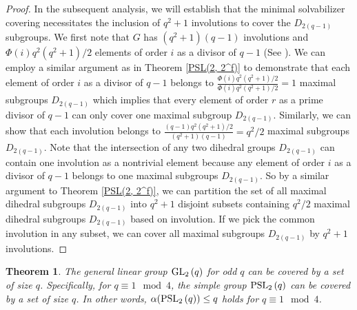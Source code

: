 \documentclass{amsart}
\newtheorem{theorem}{Theorem}[section]
\theoremstyle{definition}
\theoremstyle{remark}
\begin{document}
\begin{proof}
In the subsequent analysis, we will establish that the minimal solvabilizer covering necessitates the inclusion of $q^2+1$ involutions to cover the $D_{2(q-1)}$ subgroups. We first note that $G$ has  $(q^2+1)(q-1)$ involutions and $\Phi(i)q^2(q^2+1)/2$ elements of order $i$ as a divisor of $q-1$ (See \cite{Alavi}). We can employ a similar argument as in Theorem \ref{PSL(2, 2^f)} to demonstrate that each element of order $i$ as a divisor of $q-1$ belongs to $\frac{\Phi(i)q^2(q^2+1)/2}{\Phi(i)q^2(q^2+1)/2}=1$ maximal subgroups $D_{2(q-1)}$ which implies that every element of order $r$ as a prime divisor of $q-1$ can only cover one maximal subgroup $D_{2(q-1)}$. Similarly, we can show that each involution belongs to $\frac{(q-1)q^2(q^2+1)/2}{(q^2+1)(q-1)}=q^2/2$ maximal subgroups $D_{2(q-1)}$. Note that the intersection of any two dihedral groups $D_{2(q-1)}$ can contain one involution as a nontrivial element because any element of order $i$ as a divisor of $q-1$ belongs to one maximal subgroups $D_{2(q-1)}$. So by a similar argument to Theorem \ref{PSL(2, 2^f)}, we can partition the set of all maximal dihedral subgroups $D_{2(q-1)}$ into $q^2+1$ disjoint subsets containing $q^2/2$ maximal dihedral subgroups $D_{2(q-1)}$ based on involution. If we pick the common involution in any subset, we can cover 
all maximal subgroups $D_{2(q-1)}$ by $q^2+1$ involutions.
\end{proof}

\begin{theorem}\label{SolvabilizernumberGL} The general linear group $\operatorname{GL}_{2}\left(q\right)$ for odd $q$ can be covered by a set of size $q$. Specifically, for $q \equiv 1 \mod 4$, the simple group $\operatorname{PSL}_{2}\left(q\right)$ can be covered by a set of size $q$. In other words, $\alpha(\operatorname{PSL}_{2}\left(q\right)) \leq q$ holds for $q \equiv 1 \mod 4$. \end{theorem}
\end{document}
